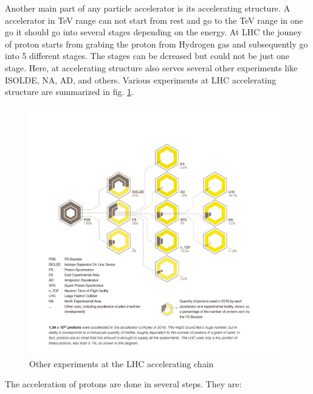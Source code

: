 Another main part of any particle accelerator is its accelerating structure. A accelerator in TeV range can not start from rest and go to the TeV range in one go it should go into several stages depending on the energy. At LHC the jouney of proton starts from grabing the proton from Hydrogen gas and subsequently go into 5 different stages. The stages can be dcreased but could not be just one stage. Here, at accelerating structure also serves several other experiments like ISOLDE, NA, AD, and others. Various experiments at LHC accelerating structure are summarized in fig. \ref{fig:OtherExpAtAccStructure}.
\begin{figure}[h]
  \begin{center}
  \includegraphics[scale=0.5]{figures/LHC/distribution_of_protons_en.jpg}
  \caption{Other experiments at the LHC accelerating chain \cite{OtherExpAtLHCAcceleratingChain}}
  \label{fig:OtherExpAtAccStructure}
  \end{center}
\end{figure}
The acceleration of protons are done in several steps.  They are:
